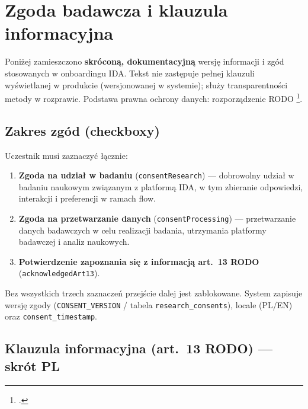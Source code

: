\chapter{Zgoda badawcza i klauzula informacyjna}
\label{app:f:top}

Poniżej zamieszczono \textbf{skróconą, dokumentacyjną} wersję informacji i zgód stosowanych w onboardingu IDA. Tekst nie zastępuje pełnej klauzuli wyświetlanej w produkcie (wersjonowanej w systemie); służy transparentności metody w rozprawie. Podstawa prawna ochrony danych: rozporządzenie RODO \footcite{eu2016gdpr}.

\section{Zakres zgód (checkboxy)}
\label{app:f:sec:zgody}

Uczestnik musi zaznaczyć łącznie:

\begin{enumerate}
  \item \textbf{Zgoda na udział w badaniu} (\texttt{consentResearch}) --- dobrowolny udział w badaniu naukowym związanym z platformą IDA, w tym zbieranie odpowiedzi, interakcji i preferencji w ramach flow.
  \item \textbf{Zgoda na przetwarzanie danych} (\texttt{consentProcessing}) --- przetwarzanie danych badawczych w celu realizacji badania, utrzymania platformy badawczej i analiz naukowych.
  \item \textbf{Potwierdzenie zapoznania się z informacją art.~13 RODO} (\texttt{acknowledgedArt13}).
\end{enumerate}

Bez wszystkich trzech zaznaczeń przejście dalej jest zablokowane. System zapisuje wersję zgody (\texttt{CONSENT\_VERSION} / tabela \texttt{research\_consents}), locale (PL/EN) oraz \texttt{consent\_timestamp}.

\section{Klauzula informacyjna (art.~13 RODO) --- skrót PL}
\label{app:f:sec:art13-pl}

